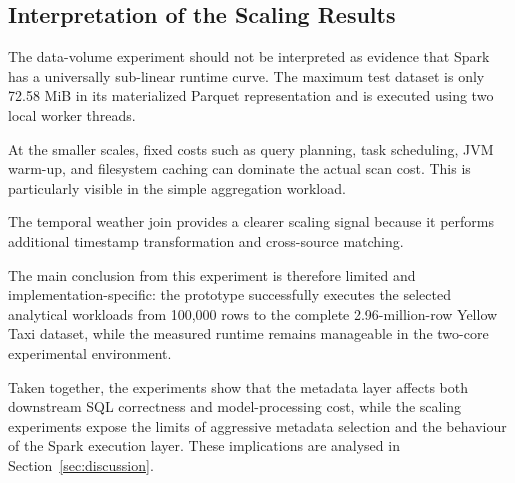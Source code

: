 \subsection{Interpretation of the Scaling Results}

The data-volume experiment should not be interpreted as evidence that Spark
has a universally sub-linear runtime curve. The maximum test dataset is only
72.58 MiB in its materialized Parquet representation and is executed using two
local worker threads.

At the smaller scales, fixed costs such as query planning, task scheduling,
JVM warm-up, and filesystem caching can dominate the actual scan cost. This is
particularly visible in the simple aggregation workload.

The temporal weather join provides a clearer scaling signal because it
performs additional timestamp transformation and cross-source matching.

The main conclusion from this experiment is therefore limited and
implementation-specific: the prototype successfully executes the selected
analytical workloads from 100,000 rows to the complete 2.96-million-row
Yellow Taxi dataset, while the measured runtime remains manageable in the
two-core experimental environment.

Taken together, the experiments show that the metadata layer affects both
downstream SQL correctness and model-processing cost, while the scaling
experiments expose the limits of aggressive metadata selection and the
behaviour of the Spark execution layer. These implications are analysed in
Section~\ref{sec:discussion}.
